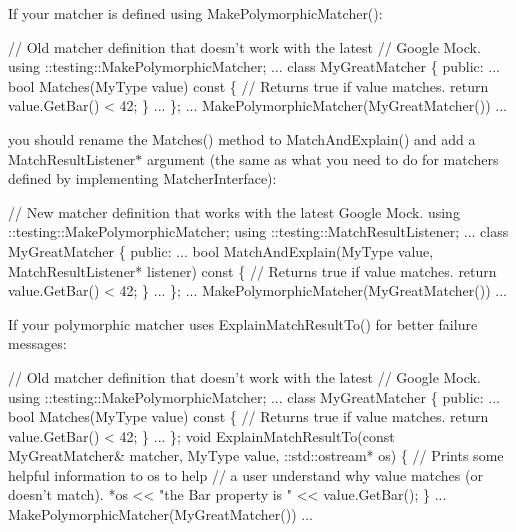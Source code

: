 If your matcher is defined using {\ttfamily Make\+Polymorphic\+Matcher()}\+: 
\begin{DoxyCode}
\textcolor{comment}{// Old matcher definition that doesn't work with the latest}
\textcolor{comment}{// Google Mock.}
using ::testing::MakePolymorphicMatcher;
...
class MyGreatMatcher \{
 \textcolor{keyword}{public}:
  ...
  \textcolor{keywordtype}{bool} Matches(MyType value)\textcolor{keyword}{ const }\{
    \textcolor{comment}{// Returns true if value matches.}
    \textcolor{keywordflow}{return} value.GetBar() < 42;
  \}
  ...
\};
... MakePolymorphicMatcher(MyGreatMatcher()) ...
\end{DoxyCode}


you should rename the {\ttfamily Matches()} method to {\ttfamily Match\+And\+Explain()} and add a {\ttfamily Match\+Result\+Listener$\ast$} argument (the same as what you need to do for matchers defined by implementing {\ttfamily Matcher\+Interface})\+: 
\begin{DoxyCode}
\textcolor{comment}{// New matcher definition that works with the latest Google Mock.}
using ::testing::MakePolymorphicMatcher;
using ::testing::MatchResultListener;
...
class MyGreatMatcher \{
 \textcolor{keyword}{public}:
  ...
  \textcolor{keywordtype}{bool} MatchAndExplain(MyType value,
                       MatchResultListener* listener)\textcolor{keyword}{ const }\{
    \textcolor{comment}{// Returns true if value matches.}
    \textcolor{keywordflow}{return} value.GetBar() < 42;
  \}
  ...
\};
... MakePolymorphicMatcher(MyGreatMatcher()) ...
\end{DoxyCode}


If your polymorphic matcher uses {\ttfamily Explain\+Match\+Result\+To()} for better failure messages\+: 
\begin{DoxyCode}
\textcolor{comment}{// Old matcher definition that doesn't work with the latest}
\textcolor{comment}{// Google Mock.}
using ::testing::MakePolymorphicMatcher;
...
class MyGreatMatcher \{
 \textcolor{keyword}{public}:
  ...
  \textcolor{keywordtype}{bool} Matches(MyType value)\textcolor{keyword}{ const }\{
    \textcolor{comment}{// Returns true if value matches.}
    \textcolor{keywordflow}{return} value.GetBar() < 42;
  \}
  ...
\};
\textcolor{keywordtype}{void} ExplainMatchResultTo(\textcolor{keyword}{const} MyGreatMatcher& matcher,
                          MyType value,
                          ::std::ostream* os) \{
  \textcolor{comment}{// Prints some helpful information to os to help}
  \textcolor{comment}{// a user understand why value matches (or doesn't match).}
  *os << \textcolor{stringliteral}{"the Bar property is "} << value.GetBar();
\}
... MakePolymorphicMatcher(MyGreatMatcher()) ...
\end{DoxyCode}


